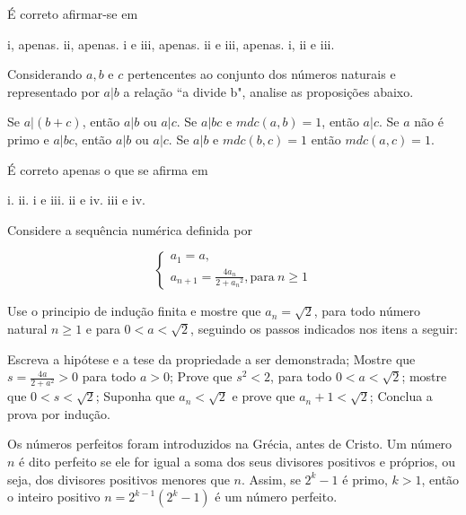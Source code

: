 \documentclass[a4paper, 12pt]{exam}
\begin{document}
\begin{questions}
            É correto afirmar-se em
            
                \begin{choices}
                    \choice i, apenas.
                    \choice ii, apenas.
                    \choice i e iii, apenas.
                    \choice ii e iii, apenas.
                    \choice i, ii e iii.
                \end{choices}

        \question
            Considerando $a,b$ e $c$ pertencentes ao conjunto dos números naturais e representado por $a|b$ a relação  ``a divide b", analise as proposições abaixo.

            \begin{subparts}
                \subpart Se $a|(b+c)$, então $a|b$ ou $a|c$.
                \subpart Se $a|bc$ e $mdc(a,b)=1$, então $a|c$.
                \subpart Se $a$ não é primo e $a|bc$, então $a|b$ ou $a|c$.
                \subpart Se $a|b$ e $mdc(b,c)=1$ então $mdc(a,c)=1$.
            \end{subparts}

            É correto apenas o que se afirma em


            \begin{choices}
                \choice i.
                \choice ii.
                \choice i e iii.
                \choice ii e iv.
                \choice iii e iv.
            \end{choices}
      \question
        Considere a sequência numérica definida por
        
            $$\begin{cases}
                a_1=a,\\
                a_{n+1}=\displaystyle\frac{4a_n}{2+a{_n}^2}, \text{para}\  n\geqslant 1
            \end{cases}$$
            
        Use o principio de indução finita e mostre que $a_n=\sqrt{2}$, para todo número natural $n\geqslant 1$ e para $0<a<\sqrt{2}$, seguindo os passos indicados nos itens a seguir:


            \begin{subparts}
                \subpart Escreva a hipótese e a tese da propriedade a ser demonstrada; 
                \subpart Mostre que $\displaystyle s=\frac{4a}{2+a^2}>0$ para todo $a>0$;
                \subpart Prove que $s^2<2$, para todo $0<a<\sqrt{2}$;
                \subpart mostre que $0<s<\sqrt{2}$;
                \subpart Suponha que $a_n<\sqrt{2}$ e prove que $a_n+1<\sqrt{2}$;
                \subpart Conclua a prova por indução.
            \end{subparts}
        \question
            Os números perfeitos foram introduzidos na Grécia, antes de Cristo. Um número $n$ é dito perfeito se ele for igual a soma dos seus divisores positivos e próprios, ou seja, dos divisores positivos menores que $n$. Assim, se $2^k -1 $ é primo, $k>1$, então o inteiro positivo $n=2^{k-1}(2^k-1)$ é um número perfeito.


\end{questions}
\end{document}
